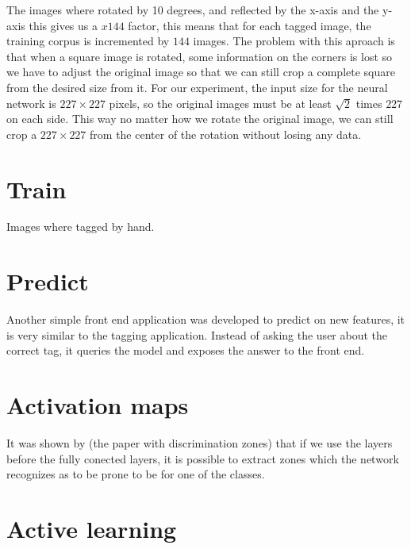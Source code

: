 The images where rotated by 10 degrees, and reflected by the x-axis and the y-axis this gives us a $x144$ factor, this means that for each tagged image, the training corpus is incremented by $144$ images. The problem with this aproach is that when a square image is rotated, some information on the corners is lost so we have to adjust the original image so that we can still crop a complete square from the desired size from it. For our experiment, the input size for the neural network is $227\times 227$ pixels, so the original images must be at least $\sqrt{2}$ times $227$ on each side. This way no matter how we rotate the original image, we can still crop a $227\times 227$ from the center of the rotation without losing any data.

\section{Train}

Images where tagged by hand.

\section{Predict}

Another simple front end application was developed to predict on new features, it is very similar to the tagging application. Instead of asking the user about the correct tag, it queries the model and exposes the answer to the front end.

\section{Activation maps}

It was shown by (the paper with discrimination zones) that if we use the layers before the fully conected layers, it is possible to extract zones which the network recognizes as to be prone to be for one of the classes.

\section{Active learning}



